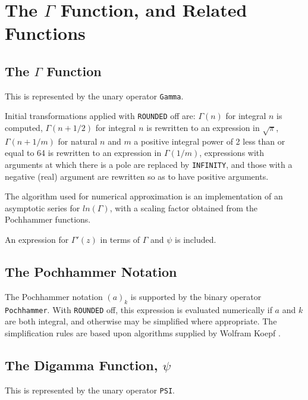 \section{The $\Gamma$ Function, and Related Functions}

\subsection{The $\Gamma$ Function}

This is represented by the unary operator {\tt Gamma}.

Initial transformations applied with {\tt ROUNDED} off are: $\Gamma(n)$ for
integral $n$ is computed, $\Gamma(n+1/2)$ for integral $n$ is rewritten to
an expression in $\sqrt\pi$, $\Gamma(n+1/m)$ for natural $n$ and $m$ a
positive integral power of 2 less than or equal to 64 is rewritten to an
expression in $\Gamma(1/m)$, expressions with arguments at which there is a
pole are replaced by {\tt INFINITY}, and those with a negative (real)
argument are rewritten so as to have positive arguments.

The algorithm used for numerical approximation is an implementation of an
asymptotic series for $ln(\Gamma)$, with a scaling factor obtained from
the Pochhammer functions.

An expression for $\Gamma'(z)$ in terms of $\Gamma$ and $\psi$ is
included.



\subsection{The Pochhammer Notation}

The Pochhammer notation $(a)_k$ is supported by the binary operator {\tt
Pochhammer}.  With {\tt ROUNDED} off, this expression is evaluated
numerically if $a$ and $k$ are both integral, and otherwise may be
simplified where appropriate.  The simplification rules are based upon
algorithms supplied by Wolfram Koepf \cite{Koepf:92}.



\subsection{The Digamma Function, $\psi$}

This is represented by the unary operator {\tt PSI}.

